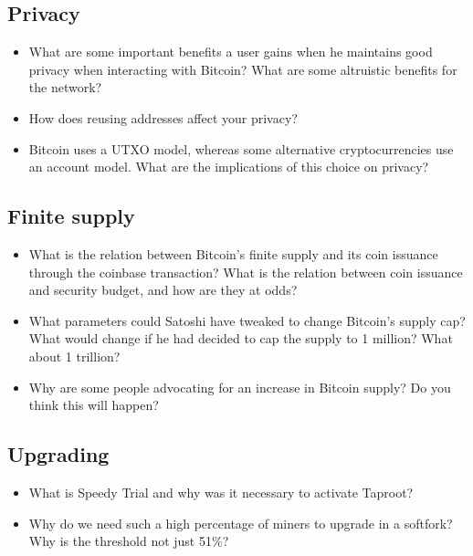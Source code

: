 \hypertarget{_privacy}{%
\subsection{Privacy}\label{_privacy}}

\begin{itemize}
\item
  What are some important benefits a user gains when he maintains good
  privacy when interacting with Bitcoin? What are some altruistic
  benefits for the network?
\item
  How does reusing addresses affect your privacy?
\item
  Bitcoin uses a UTXO model, whereas some alternative cryptocurrencies
  use an account model. What are the implications of this choice on
  privacy?
\end{itemize}

\hypertarget{_finite_supply}{%
\subsection{Finite supply}\label{_finite_supply}}

\begin{itemize}
\item
  What is the relation between Bitcoin's finite supply and its coin
  issuance through the coinbase transaction? What is the relation
  between coin issuance and security budget, and how are they at odds?
\item
  What parameters could Satoshi have tweaked to change Bitcoin's supply
  cap? What would change if he had decided to cap the supply to 1
  million? What about 1 trillion?
\item
  Why are some people advocating for an increase in Bitcoin supply? Do
  you think this will happen?
\end{itemize}

\hypertarget{_upgrading}{%
\subsection{Upgrading}\label{_upgrading}}

\begin{itemize}
\item
  What is Speedy Trial and why was it necessary to activate Taproot?
\item
  Why do we need such a high percentage of miners to upgrade in a
  softfork? Why is the threshold not just 51\%?
\end{itemize}

